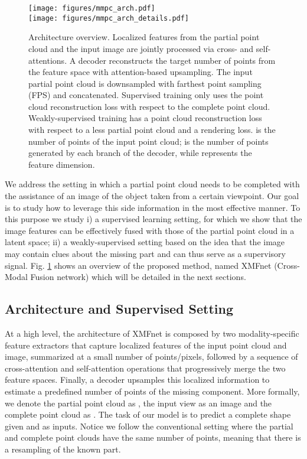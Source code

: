 \documentclass{article}
\begin{document}
\begin{figure}
  \centering
    \texttt{[image: figures/mmpc\_arch.pdf]}\\ \vspace*{15pt}
    \texttt{[image: figures/mmpc\_arch\_details.pdf]}
    \vspace{-10pt}
  \caption{Architecture overview. Localized features from the partial point cloud and the input image are jointly processed via cross- and self-attentions. A decoder reconstructs the target number of points from the feature space with attention-based upsampling. The input partial point cloud is downsampled with farthest point sampling (FPS) and concatenated. Supervised training only uses the point cloud reconstruction loss with respect to the complete point cloud. Weakly-supervised training has a point cloud reconstruction loss with respect to a less partial point cloud and a rendering loss.  is the number of points of the input point cloud;  is the number of points generated by each branch of the decoder, while  represents the feature dimension.}
  \label{fig:arch}
  \vspace{-10pt}
\end{figure}

We address the setting in which a partial point cloud needs to be completed with the assistance of an image of the object taken from a certain viewpoint. Our goal is to study how to leverage this side information in the most effective manner. To this purpose we study i) a supervised learning setting, for which we show that the image features can be effectively fused with those of the partial point cloud in a latent space; ii) a weakly-supervised setting based on the idea that the image may contain clues about the missing part and can thus serve as a supervisory signal. Fig. \ref{fig:arch} shows an overview of the proposed method, named XMFnet (Cross-Modal Fusion network) which will be detailed in the next sections.



\subsection{Architecture and Supervised Setting} 
\label{sec:arch}

At a high level, the architecture of XMFnet is composed by two modality-specific feature extractors that capture localized features of the input point cloud and image, summarized at a small number of points/pixels, followed by a sequence of cross-attention and self-attention operations that progressively merge the two feature spaces. Finally, a decoder upsamples this localized information to estimate a predefined number of points of the missing component. More formally, we denote the partial point cloud as , the input view as an image  and the complete point cloud as . The task of our model is to predict a complete shape  given  and  as inputs. Notice we follow the conventional setting where the partial and complete point clouds have the same number of points, meaning that there is a resampling of the known part.
\end{document}
